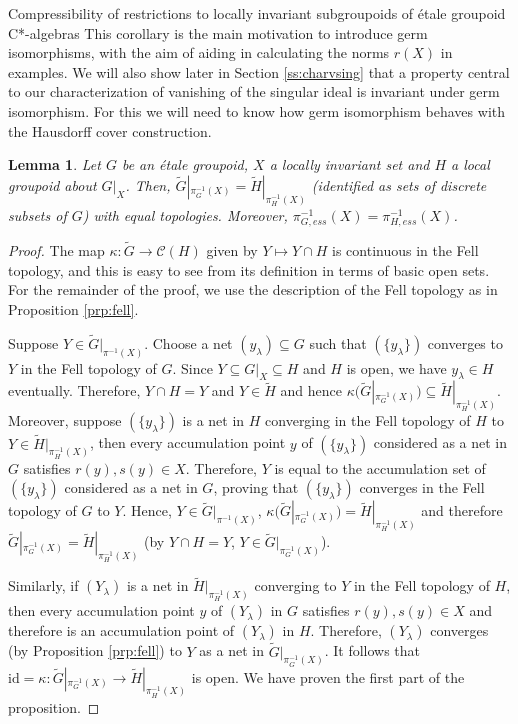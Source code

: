 \documentclass[a4paper, 12pt]{amsart}
\newtheorem{lem}[thm]{Lemma}
\theoremstyle{definition}
\theoremstyle{remark}
\numberwithin{equation}{section}
\begin{document}
\begin{section}{Compressibility of restrictions to locally invariant subgroupoids of \'etale groupoid C*-algebras}
This corollary is the main motivation to introduce germ isomorphisms, with the aim of aiding in calculating the norms $r(X)$ in examples. We will also show later in Section \ref{ss:charvsing} that a property central to our characterization of vanishing of the singular ideal is invariant under germ isomorphism. For this we will need to know how germ isomorphism behaves with the Hausdorff cover construction.

\begin{lem}
\label{lem:germ&cover}
    Let $G$ be an \'etale groupoid, $X$ a locally invariant set and $H$ a local groupoid about $G|_{X}$. Then, $\tilde{G}|_{\pi_{G}^{-1}(X)} = \tilde{H}|_{\pi_{H}^{-1}(X)}$ (identified as sets of discrete subsets of $G$) with equal topologies. Moreover, $\pi_{G,ess}^{-1}(X) = \pi^{-1}_{H,ess}(X)$.
\end{lem}
\begin{proof}
    The map $\kappa:\tilde{G}\to \mathcal{C}(H)$ given by $Y\mapsto Y\cap H$ is continuous in the Fell topology, and this is easy to see from its definition in terms of basic open sets. For the remainder of the proof, we use the description of the Fell topology as in Proposition \ref{prp:fell}.

    Suppose $Y\in \tilde{G}|_{\pi^{-1}(X)}$. Choose a net $(y_{\lambda})\subseteq G$ such that $(\{y_{\lambda}\})$ converges to $Y$ in the Fell topology of $G$. Since $Y\subseteq G|_{X}\subseteq H$ and $H$ is open, we have $y_{\lambda}\in H$ eventually. Therefore, $Y\cap H = Y$ and $Y\in \tilde{H}$ and hence $\kappa(\tilde{G}|_{\pi_{G}^{-1}(X)})\subseteq \tilde{H}|_{\pi_{H}^{-1}(X)}$. Moreover, suppose $(\{y_{\lambda}\})$ is a net in $H$ converging in the Fell topology of $H$ to $Y\in \tilde{H}|_{\pi^{-1}_{H}(X)}$, then every accumulation point $y$ of $(\{y_{\lambda}\})$ considered as a net in $G$ satisfies $r(y),s(y)\in X$. Therefore, $Y$ is equal to the accumulation set of $(\{y_{\lambda}\})$ considered as a net in $G$, proving that $(\{y_{\lambda}\})$ converges in the Fell topology of $G$ to $Y$. Hence, $Y\in \tilde{G}|_{\pi^{-1}(X)}$, $\kappa(\tilde{G}|_{\pi_{G}^{-1}(X)}) = \tilde{H}|_{\pi_{H}^{-1}(X)}$ and therefore $\tilde{G}|_{\pi_{G}^{-1}(X)} = \tilde{H}|_{\pi_{H}^{-1}(X)}$ (by $Y\cap H = Y$, $Y\in \tilde{G}|_{\pi_{G}^{-1}(X)}$).
    
    Similarly, if $(Y_{\lambda})$ is a net in $\tilde{H}|_{\pi_{H}^{-1}(X)}$ converging to $Y$ in the Fell topology of $H$, then every accumulation point $y$ of $(Y_{\lambda})$ in $G$ satisfies $r(y),s(y)\in X$ and therefore is an accumulation point of $(Y_{\lambda})$ in $H$. Therefore, $(Y_{\lambda})$ converges (by Proposition \ref{prp:fell}) to $Y$ as a net in $\tilde{G}|_{\pi_{G}^{-1}(X)}$. It follows that $\text{id} = \kappa:\tilde{G}|_{\pi_{G}^{-1}(X)} \to \tilde{H}|_{\pi_{H}^{-1}(X)}$ is open. We have proven the first part of the proposition.


\end{proof}
\end{section}
\end{document}
